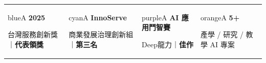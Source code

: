 \documentclass[10pt,a4paper]{extarticle}
\newcommand{\hi}[1]{\textcolor{redA}{\textbf{#1}}}
\begin{document}
\vspace{1mm}
\begin{tabularx}{\linewidth}{@{}XXXX@{}}
\begin{colorboxx}[height=14mm,valign=center]{blueA}
  {\Large\bfseries\textcolor{blueA}{2025}}\par
  {\small 台灣服務創新獎｜\hi{代表領獎}}
\end{colorboxx}
&
\begin{colorboxx}[height=14mm,valign=center]{cyanA}
  {\Large\bfseries\textcolor{cyanA}{InnoServe}}\par
  {\small 商業發展治理創新組｜\hi{第三名}}
\end{colorboxx}
&
\begin{colorboxx}[height=14mm,valign=center]{purpleA}
  {\Large\bfseries\textcolor{purpleA}{AI 應用鬥智賽}}\par
  {\small Deep龍力｜\hi{佳作}}
\end{colorboxx}
&
\begin{colorboxx}[height=14mm,valign=center]{orangeA}
  {\Large\bfseries\textcolor{orangeA}{5+}}\par
  {\small 產學 / 研究 / 教學 AI 專案}
\end{colorboxx}
\end{tabularx}
\end{document}
